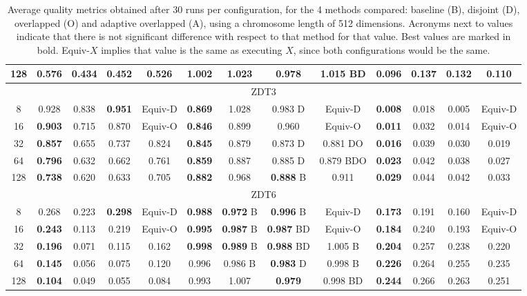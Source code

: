 \documentclass[preprint]{elsarticle}
\begin{document}
\begin{table*}
{\begin{tabular}{|c||c|c|c|c||c|c|c|c||c|c|c|c||}
128	& \textbf{	0.576	}	&	0.434		&	0.452			&	0.526			&	1.002		&	1.023			& \textbf{	0.978	}		&	1.015	BD		& \textbf{	0.096	}	&	0.137		&	0.132		&	0.110					\\ \hline
\multicolumn{13}{|c|}{ZDT3}																																													\\ \hline
8	&	0.928		&	0.838		& \textbf{	0.951	}		&	Equiv-D			& \textbf{	0.869	}	&	1.028			&	0.983		D	&	Equiv-D			& \textbf{	0.008	}	&	0.018		&	0.005		&	Equiv-D					\\
16	& \textbf{	0.903	}	&	0.715		&	0.870			&	Equiv-O			& \textbf{	0.846	}	&	0.899			&	0.960			&	Equiv-O			& \textbf{	0.011	}	&	0.032		&	0.014		&	Equiv-O					\\
32	& \textbf{	0.857	}	&	0.655		&	0.737			&	0.824			& \textbf{	0.845	}	&	0.879			&	0.873		D	&	0.881	DO		& \textbf{	0.016	}	&	0.039		&	0.030		&	0.019					\\
64	& \textbf{	0.796	}	&	0.632		&	0.662			&	0.761			& \textbf{	0.859	}	&	0.887			&	0.885		D	&	0.879	BDO		& \textbf{	0.023	}	&	0.042		&	0.038		&	0.027					\\
128	& \textbf{	0.738	}	&	0.620		&	0.633			&	0.705			& \textbf{	0.882	}	&	0.968			& \textbf{	0.888	}	B	&	0.911			& \textbf{	0.029	}	&	0.044		&	0.042		&	0.033					\\ \hline
\multicolumn{13}{|c|}{ZDT6}																																													\\ \hline
8	&	0.268		&	0.223		& \textbf{	0.298	}		&	Equiv-D			& \textbf{	0.988	}	& \textbf{	0.972	}	B	& \textbf{	0.996	}	B	&	Equiv-D			& \textbf{	0.173	}	&	0.191		&	0.160		&	Equiv-D					\\
16	& \textbf{	0.243	}	&	0.113		&	0.219			&	Equiv-O			& \textbf{	0.995	}	& \textbf{	0.987	}	B	& \textbf{	0.987	}	BD	&	Equiv-O			& \textbf{	0.184	}	&	0.240		&	0.193		&	Equiv-O					\\
32	& \textbf{	0.196	}	&	0.071		&	0.115			&	0.162			& \textbf{	0.998	}	& \textbf{	0.989	}	B	& \textbf{	0.988	}	BD	&	1.005	B		& \textbf{	0.204	}	&	0.257		&	0.238		&	0.220					\\
64	& \textbf{	0.145	}	&	0.056		&	0.075			&	0.120			&	0.996		&	0.986		B	& \textbf{	0.983	}	D	&	0.998	B		& \textbf{	0.226	}	&	0.264		&	0.255		&	0.235					\\
128	& \textbf{	0.104	}	&	0.049		&	0.055			&	0.084			&	0.993		&	1.007			& \textbf{	0.979	}		&	0.998	BD		& \textbf{	0.244	}	&	0.266		&	0.263		&	0.251					\\ \hline

\end{tabular}
}
\caption{Average quality metrics obtained after 30 runs per configuration, for the 4 methods compared: baseline (B), disjoint (D), overlapped (O) and adaptive overlapped (A), using a chromosome length of 512 dimensions. Acronyms next to values indicate that there is not significant difference with respect to that method for that value. Best values are marked in bold. Equiv-$X$ implies that value is the same as executing $X$, since both configurations would be the same.}
\label{tab:results512}
\end{table*}
\end{document}
